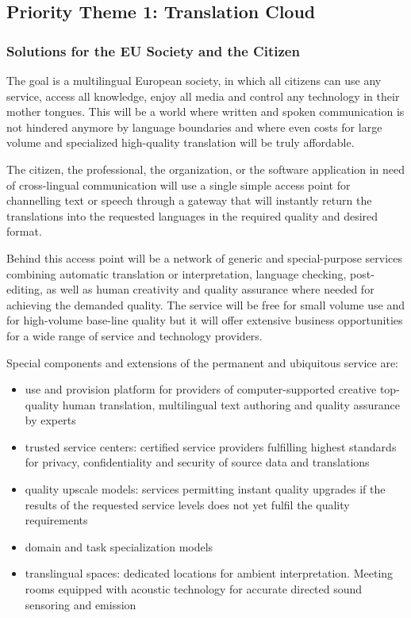 \documentclass[10pt, plain]{../../metanetpaper}
\begin{document}
\begin{multicols}{2}
\subsection{Priority Theme 1: Translation Cloud}
\label{sec:priority-theme-1-translation-cloud}

\subsubsection{Solutions for the EU Society and the Citizen}
\label{sec:solutions-eu-society-pt1}

The goal is a multilingual European society, in which all citizens can use any service, access all knowledge, enjoy all media and control any technology in their mother tongues. This will be a world where written and spoken communication is not hindered anymore by language boundaries and where even costs for large volume and specialized high-quality translation will be truly affordable.
 
The citizen, the professional, the organization, or the software application in need of cross-lingual communication will use a single simple access point for channelling text or speech through a gateway that will instantly return the translations into the requested languages in the required quality and desired format.
 
Behind this access point will be a network of generic and special-purpose services combining automatic translation or interpretation, language checking, post-editing, as well as human creativity and quality assurance where needed for achieving the demanded quality.  The service will be free for small volume use and for high-volume base-line quality but it will offer extensive business opportunities for a wide range of service and technology providers.
 
Special components and extensions of the permanent and ubiquitous service are:

\begin{itemize}
\item use and provision platform for providers of computer-supported creative top-quality human translation, multilingual text authoring and quality assurance by experts
\item trusted service centers: certified service providers fulfilling highest standards for privacy, confidentiality and security of source data and translations
\item quality upscale models: services permitting instant quality upgrades if the results of the requested service levels does not yet fulfil the quality requirements
\item domain and task specialization models
\item translingual spaces: dedicated locations for ambient interpretation. Meeting rooms equipped with acoustic technology for accurate directed sound sensoring and emission
\end{itemize}


\end{multicols}
\end{document}
